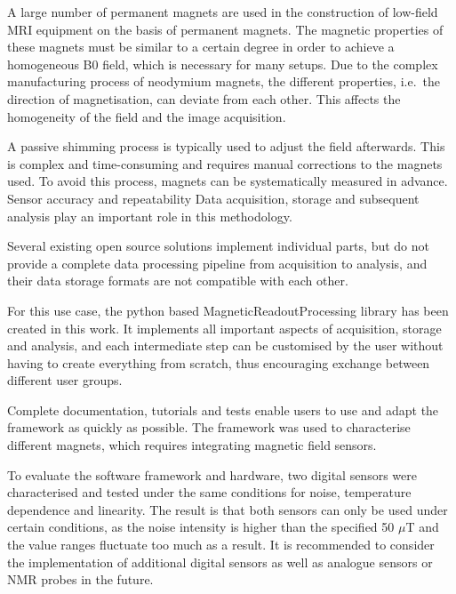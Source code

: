 A large number of permanent magnets are used in the construction of
low-field MRI equipment on the basis of permanent magnets. The magnetic
properties of these magnets must be similar to a certain degree in order
to achieve a homogeneous B0 field, which is necessary for many setups. Due to the complex manufacturing process of neodymium magnets, the
different properties, i.e.~the direction of magnetisation, can deviate
from each other. This affects the homogeneity of the field and the image
acquisition.

A passive shimming process is typically used to adjust the field
afterwards. This is complex and time-consuming and requires manual
corrections to the magnets used. To avoid this process, magnets can be
systematically measured in advance. Sensor accuracy and repeatability
Data acquisition, storage and subsequent analysis play an important role
in this methodology.

Several existing open source solutions implement individual parts, but
do not provide a complete data processing pipeline from acquisition to
analysis, and their data storage formats are not compatible with each
other.

For this use case, the python based MagneticReadoutProcessing library
has been created in this work. It implements all important aspects of
acquisition, storage and analysis, and each intermediate step can be
customised by the user without having to create everything from scratch,
thus encouraging exchange between different user groups.

Complete documentation, tutorials and tests enable users to use and
adapt the framework as quickly as possible. The framework was used to
characterise different magnets, which requires integrating magnetic
field sensors.

To evaluate the software framework and hardware, two digital sensors
were characterised and tested under the same conditions for noise,
temperature dependence and linearity. The result is that both sensors
can only be used under certain conditions, as the noise intensity is
higher than the specified 50 \(\mu\)T and the value ranges fluctuate too
much as a result. It is recommended to consider the implementation of
additional digital sensors as well as analogue sensors or NMR probes in
the future.
